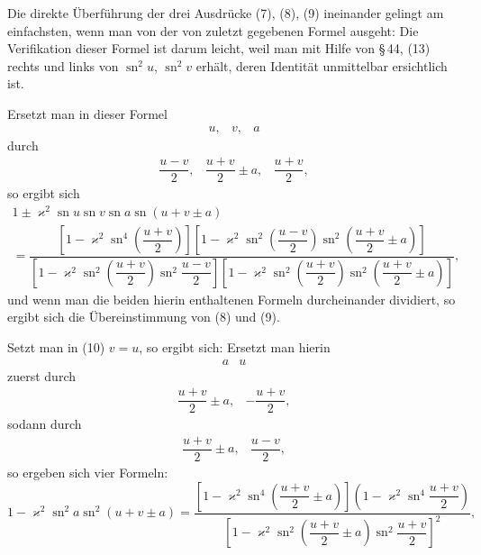 
Die direkte Überführung der drei Ausdrücke (7), (8), (9) ineinander
 gelingt am einfachsten, wenn man von der von
 zuletzt gegebenen Formel ausgeht:
Die Verifikation dieser Formel ist darum leicht, weil man
mit Hilfe von \S\,44, (13) rechts und links 
von $\operatorname{sn}^2u$, $\operatorname{sn}^2v$ erhält, deren Identität unmittelbar ersichtlich ist.

Ersetzt man in dieser Formel
\[
\begin{array}{ccc}
u, & v, & a
\end{array}
\]
durch
\[
\begin{array}{ccc}
\dfrac{u-v}{2}, & \dfrac{u+v}{2}\pm a, & \dfrac{u+v}{2},
\end{array}
\]
so ergibt sich
\[
\begin{gathered}
1 \pm \varkappa^2 \operatorname{sn} u\operatorname{sn} v\operatorname{sn} a\operatorname{sn}(u+v\pm a) \\
= \dfrac{\left[1-\varkappa^2\operatorname{sn}^4\left(\dfrac{u+v}{2}\right)\right]\left[1-\varkappa^2\operatorname{sn}^2\left(\dfrac{u-v}{2}\right)\operatorname{sn}^2\left(\dfrac{u+v}{2}\pm a\right)\right]}{\left[1-\varkappa^2\operatorname{sn}^2\left(\dfrac{u+v}{2}\right)\operatorname{sn}^2\dfrac{u-v}{2}\right]\left[1-\varkappa^2\operatorname{sn}^2\left(\dfrac{u+v}{2}\right)\operatorname{sn}^2\left(\dfrac{u+v}{2}\pm a\right)\right]},
\end{gathered}
\]
und wenn man die beiden hierin enthaltenen Formeln durcheinander
 dividiert, so ergibt sich die Übereinstimmung von (8)
und (9).

Setzt man in (10) $v=u$, so ergibt sich:
Ersetzt man hierin
\[
\begin{array}{cc}
a & u
\end{array}
\]
zuerst durch
\[
\begin{array}{cc}
\dfrac{u+v}{2}\pm a, & -\dfrac{u+v}{2},
\end{array}
\]
sodann durch
\[
\begin{array}{cc}
\dfrac{u+v}{2}\pm a, & \dfrac{u-v}{2},
\end{array}
\]
so ergeben sich vier Formeln:
\[
1 - \varkappa^2\operatorname{sn}^2a\operatorname{sn}^2(u+v\pm a) = \dfrac{\left[1-\varkappa^2\operatorname{sn}^4\left(\dfrac{u+v}{2}\pm a\right)\right]\left(1-\varkappa^2\operatorname{sn}^4\dfrac{u+v}{2}\right)}{\left[1-\varkappa^2\operatorname{sn}^2\left(\dfrac{u+v}{2}\pm a\right)\operatorname{sn}^2\dfrac{u+v}{2}\right]^2},
\]
